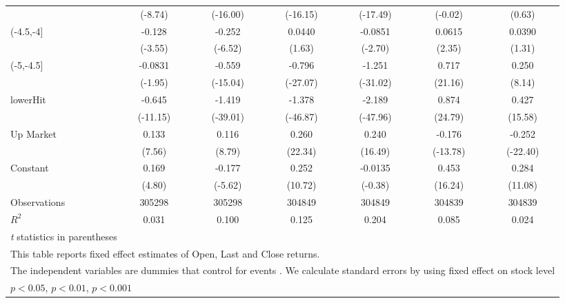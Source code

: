 {\begin{tabular}{l*{6}{c}}
                    &     (-8.74)         &    (-16.00)         &    (-16.15)         &    (-17.49)         &     (-0.02)         &      (0.63)         \\
[1em]
(-4.5,-4]           &      -0.128\sym{***}&      -0.252\sym{***}&      0.0440         &     -0.0851\sym{**} &      0.0615\sym{*}  &      0.0390         \\
                    &     (-3.55)         &     (-6.52)         &      (1.63)         &     (-2.70)         &      (2.35)         &      (1.31)         \\
[1em]
(-5,-4.5]           &     -0.0831         &      -0.559\sym{***}&      -0.796\sym{***}&      -1.251\sym{***}&       0.717\sym{***}&       0.250\sym{***}\\
                    &     (-1.95)         &    (-15.04)         &    (-27.07)         &    (-31.02)         &     (21.16)         &      (8.14)         \\
[1em]
lowerHit            &      -0.645\sym{***}&      -1.419\sym{***}&      -1.378\sym{***}&      -2.189\sym{***}&       0.874\sym{***}&       0.427\sym{***}\\
                    &    (-11.15)         &    (-39.01)         &    (-46.87)         &    (-47.96)         &     (24.79)         &     (15.58)         \\
[1em]
Up Market           &       0.133\sym{***}&       0.116\sym{***}&       0.260\sym{***}&       0.240\sym{***}&      -0.176\sym{***}&      -0.252\sym{***}\\
                    &      (7.56)         &      (8.79)         &     (22.34)         &     (16.49)         &    (-13.78)         &    (-22.40)         \\
[1em]
Constant            &       0.169\sym{***}&      -0.177\sym{***}&       0.252\sym{***}&     -0.0135         &       0.453\sym{***}&       0.284\sym{***}\\
                    &      (4.80)         &     (-5.62)         &     (10.72)         &     (-0.38)         &     (16.24)         &     (11.08)         \\
\hline
Observations        &      305298         &      305298         &      304849         &      304849         &      304839         &      304839         \\
\(R^{2}\)           &       0.031         &       0.100         &       0.125         &       0.204         &       0.085         &       0.024         \\
\hline\hline
\multicolumn{7}{l}{\footnotesize \textit{t} statistics in parentheses}\\
\multicolumn{7}{l}{\footnotesize This table reports fixed effect estimates of Open, Last and Close returns.}\\
\multicolumn{7}{l}{\footnotesize The independent variables are dummies that control for events . We calculate standard errors by using fixed effect on stock level}\\
\multicolumn{7}{l}{\footnotesize \sym{*} \(p<0.05\), \sym{**} \(p<0.01\), \sym{***} \(p<0.001\)}\\
\end{tabular}
}
